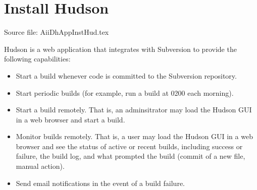 
\section{Install Hudson}

Source file: AiiDhAppInstHud.tex

Hudson is a web application that integrates with Subversion to provide
the following capabilities: 
\begin{itemize}
\item	Start a build whenever code is committed to the Subversion repository.  
\item	Start periodic builds (for example, run a build at 0200 each morning).  
\item	Start a build remotely.  That is, an adminsitrator may load the 
	Hudson GUI in a web browser and start a build.  
\item	Monitor builds remotely.  That is, a user may load the Hudson
	GUI in a web browser and see the status of active or recent builds,
	including success or failure, the build log, and what prompted 
	the build (commit of a new file, manual action).  
\item	Send email notifications in the event of a build failure.
\end{itemize}

